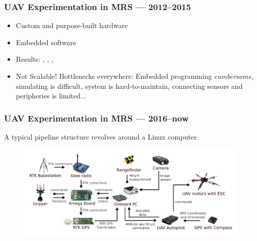 \documentclass[aspectratio=1610]{beamer}
\begin{document}
  \begin{frame}
    \frametitle{UAV Experimentation in MRS --- 2012--2015}

    \begin{itemize}
      \item Custom and purpose-built hardware
      \item Embedded software
      \item Results: \cite{baca2016embedded}, \cite{spurny2016complex}, \cite{saska2016auro}, \cite{chudoba2016exploration}
      \item {\color{red} Not Scalable! Bottlenecks everywhere: Embedded programming \emph{cumbersome}, simulating is difficult, system is hard-to-maintain, connecting sensors and peripheries is limited...}
    \end{itemize}

  \end{frame}


  \begin{frame}
    \frametitle{UAV Experimentation in MRS --- 2016--now}

    \begin{block}{A typical pipeline structure revolves around a Linux computer.}
      \begin{figure}
        \includegraphics[width=1.0\textwidth]{fig/components.png}
      \end{figure}
    \end{block}

  \end{frame}

\end{document}

